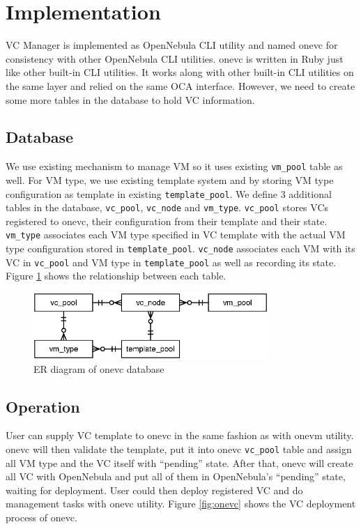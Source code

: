 \documentclass[conference]{IEEEtran}
\begin{document}
\section{Implementation}
VC Manager is implemented as OpenNebula CLI utility and named onevc for consistency with other OpenNebula CLI utilities.
onevc is written in Ruby just like other built-in CLI utilities.
It works along with other built-in CLI utilities on the same layer and relied on the same OCA interface.
However, we need to create some more tables in the database to hold VC information.

\subsection{Database}
We use existing mechanism to manage VM so it uses existing \texttt{vm\_pool} table as well.
For VM type, we use existing template system and by storing VM type configuration as template in existing \texttt{template\_pool}.
We define 3 additional tables in the database, \texttt{vc\_pool}, \texttt{vc\_node} and \texttt{vm\_type}.
\texttt{vc\_pool} stores VCs registered to onevc, their configuration from their template and their state.
\texttt{vm\_type} associates each VM type specified in VC template with the actual VM type configuration stored in \texttt{template\_pool}.
\texttt{vc\_node} associates each VM with its VC in \texttt{vc\_pool} and VM type in \texttt{template\_pool} as well as recording its state.
Figure \ref{fig:database} shows the relationship between each table.

\begin{figure}[!t]
\centering
\includegraphics[width=3.5in]{database}
\caption{ER diagram of onevc database}
\label{fig:database}
\end{figure}

\subsection{Operation}
User can supply VC template to onevc in the same fashion as with onevm utility.
onevc will then validate the template, put it into onevc \texttt{vc\_pool} table and assign all VM type and the VC itself with ``pending'' state.
After that, onevc will create all VC with OpenNebula and put all of them in OpenNebula's ``pending'' state, waiting for deployment.
User could then deploy registered VC and do management tasks with onevc utility.
Figure \ref{fig:onevc} shows the VC deployment process of onevc.
\end{document}
